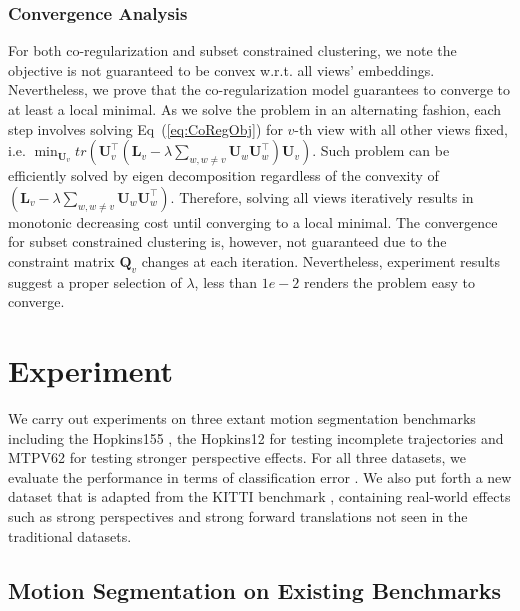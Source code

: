 \documentclass[10pt,twocolumn,letterpaper]{article}
\newcommand{\matr}[1]{\mathbf{#1}}
\begin{document}
\subsubsection{Convergence Analysis}

For both co-regularization and subset constrained clustering, we note the objective is not guaranteed to be convex w.r.t. all views' embeddings. Nevertheless, we prove that the co-regularization model guarantees to converge to at least a local minimal. As we solve the problem in an alternating fashion, each step involves solving Eq~(\ref{eq:CoRegObj}) for $v$-th view with all other views fixed, i.e. $\min_{\matr{U}_v}tr\left(\matr{U}_v^\top\left(\matr{L}_v-\lambda\sum_{w,w\neq v}\matr{U}_w\matr{U}_w^\top\right)\matr{U}_v\right)$. Such problem can be efficiently solved by eigen decomposition regardless of the convexity of $\left(\matr{L}_v-\lambda\sum_{w,w\neq v}\matr{U}_w\matr{U}_w^\top\right)$. Therefore, solving all views iteratively results in monotonic decreasing cost until converging to a local minimal. The convergence for subset constrained clustering is, however, not guaranteed due to the constraint matrix $\matr{Q}_v$ changes at each iteration. Nevertheless, experiment results suggest a proper selection of $\lambda$, less than $1e-2$ renders the problem easy to converge.





\vspace{-0.2cm}
\section{Experiment}

We carry out experiments on three extant motion segmentation benchmarks including the Hopkins155 \cite{Tron2007}, the Hopkins12 \cite{Rao2010} for testing incomplete trajectories and MTPV62 \cite{Li2013} for testing stronger perspective effects. For all three datasets, we evaluate the performance in terms of classification error \cite{Tron2007}. We also put forth a new dataset that is adapted from the KITTI benchmark \cite{Geiger2013IJRR}, containing real-world effects such as strong perspectives and strong forward translations not seen in the traditional datasets.









\subsection{Motion Segmentation on Existing Benchmarks}
\end{document}
